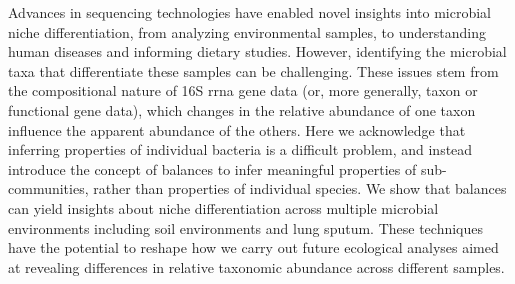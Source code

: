 Advances in sequencing technologies have enabled novel insights into microbial niche differentiation, from analyzing environmental samples, to understanding human diseases and informing dietary studies.  However, identifying the microbial taxa that differentiate these samples can be challenging. These issues stem from the compositional nature of 16S \gls{rrna} gene data (or, more generally, taxon or functional gene data), which changes in the relative abundance of one taxon influence the apparent abundance of the others.  Here we acknowledge that inferring properties of individual bacteria is a difficult problem, and instead introduce the concept of balances to infer meaningful properties of sub-communities, rather than properties of individual species.  We show that balances can yield insights about niche differentiation across multiple microbial environments including soil environments and lung sputum. These techniques have the potential to reshape how we carry out future ecological analyses aimed at revealing differences in relative taxonomic abundance across different samples.
